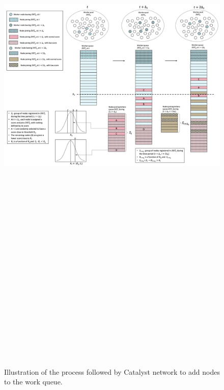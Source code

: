 \documentclass[a4paper, 12pt]{book}
\begin{document}
\newpage
\begin{landscape}
\begin{figure}
\centering
\includegraphics[width=22cm,height=42cm,keepaspectratio]{Work_Queue_Management}
\caption{\label{fig:NSM}Illustration of the process followed by Catalyst network to add nodes to the work queue.}
\end{figure}
\end{landscape}
\end{document}
